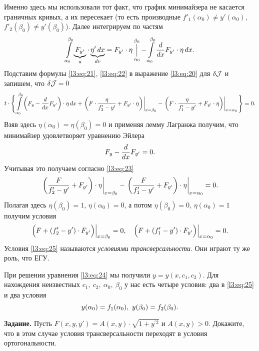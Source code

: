 Именно здесь мы использовали тот факт, что график минимайзера не касается граничных кривых, а их пересекает (то есть производные $f'_1(\alpha_0)\neq y'(\alpha_0)$,\ $f'_2(\beta_0)\neq y'(\beta_0)$). Далее интегрируем по частям 
\begin{equation}
	\label{l3:eq:22}
	\int\limits_{\alpha_0}^{\beta_0}\underbrace{F_{y'}}_{u}\cdot\underbrace{\eta'\,dx}_{dv}=F_{y'}\cdot\eta\mathop{\Big|}\limits_{\alpha_0}^{\beta_0}-\int\limits_{\alpha_0}^{\beta_0}\frac{d}{dx}F_{y'}\cdot\eta\,dx.
\end{equation}
Подставим формулы \eqref{l3:eq:21}, \eqref{l3:eq:22} в выражение \eqref{l3:eq:20} для $\delta\mathcal{J}$ и запишем, что $\delta\mathcal{J}=0$
\begin{equation}
	\label{l3:eq:23}
	t\cdot\Bigg\{\int\limits_{\alpha_0}^{\beta_0}\left(F_{y}-\frac{d}{dx}F_{y'}\right)\cdot\eta\,dx+\left.\left(F\cdot\frac{\eta}{f'_2-y'}+F_{y'}\cdot\eta\right)\right|_{x=\beta_0}-\left.\left(F\cdot\frac{\eta}{f'_1-y'}+F_{y'}\cdot\eta\right)\right|_{x=\alpha_0}\Bigg\}=0.
\end{equation}
Взяв здесь $\eta(\alpha_0)=\eta(\beta_0)=0$ и применяя лемму Лагранжа получим, что минимайзер удовлетворяет уравнению Эйлера 
\begin{equation}
	\label{l3:eq:24}
	\hfill F_{y}-\der{}{x}F_{y'}=0.\hfill
\end{equation}
Учитывая это получаем согласно \eqref{l3:eq:23} 
\begin{equation*}
	\hfill\left.\left(\frac{F}{f'_2-y'}+F_{y'}\right)\cdot\eta\right|_{x=\beta_0}-\left.\left(\frac{F}{f'_1-y'}+F_{y'}\right)\cdot\eta\right|_{x=\alpha_0}=0.\hfill
\end{equation*}
Полагая здесь $\eta(\beta_0)=1$, $\eta(\alpha_0)=0$, а потом $\eta(\beta_0)=0$, $\eta(\alpha_0)=1$ получим условия
\begin{equation}
	\label{l3:eq:25}
	\hfill \Big(F+(f'_2-y')\cdot F_{y'}\Big)\Big|_{x=\beta_0}=0,\quad \Big(F+(f'_1-y')\cdot F_{y'}\Big)\Big|_{x=\alpha_0}=0.\hfill
\end{equation}
Условия \eqref{l3:eq:25} называются \emph{условиями трансверсальности}. Они играют ту же роль, что ЕГУ.

При решении уравнения \eqref{l3:eq:24} мы получили $y=y(x,c_1,c_2)$. Для нахождения неизвестных $c_1,\ c_2,\ \alpha_0,\ \beta_0$ у нас есть четыре условия: два в \eqref{l3:eq:25} и два условия
\begin{equation*}
	\hfill y(\alpha_0)=f_1(\alpha_0),\ y(\beta_0)=f_2(\beta_0).\hfill
\end{equation*}
\vspace{0.2cm}

\noindent\textbf{Задание. }Пусть $F(x,y,y')=A(x,y)\cdot\sqrt{1+y^{\prime2}}$ и $A(x,y)>0$. Докажите, что в этом случае условия трансверсальности переходят в условия ортогональности. 